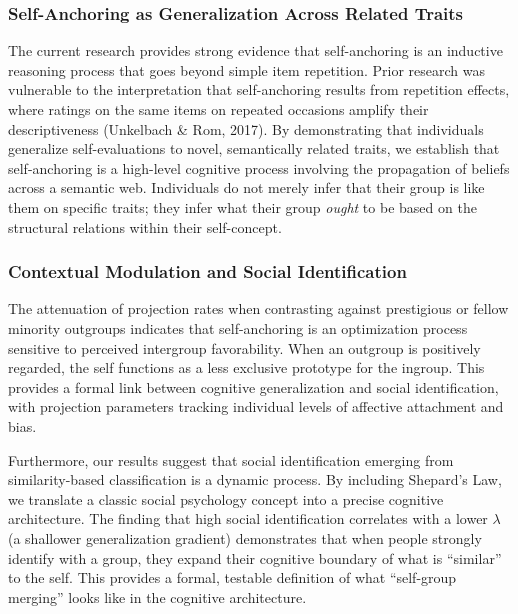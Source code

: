 \documentclass[
  man,
  longtable,
  nolmodern,
  notxfonts,
  notimes,
  man]{apa7}
\begin{document}
\subsubsection{Self-Anchoring as Generalization Across Related
Traits}\label{self-anchoring-as-generalization-across-related-traits}

The current research provides strong evidence that self-anchoring is an
inductive reasoning process that goes beyond simple item repetition.
Prior research was vulnerable to the interpretation that self-anchoring
results from repetition effects, where ratings on the same items on
repeated occasions amplify their descriptiveness (Unkelbach \& Rom,
2017). By demonstrating that individuals generalize self-evaluations to
novel, semantically related traits, we establish that self-anchoring is
a high-level cognitive process involving the propagation of beliefs
across a semantic web. Individuals do not merely infer that their group
is like them on specific traits; they infer what their group
\emph{ought} to be based on the structural relations within their
self-concept.

\subsubsection{Contextual Modulation and Social
Identification}\label{contextual-modulation-and-social-identification}

The attenuation of projection rates when contrasting against prestigious
or fellow minority outgroups indicates that self-anchoring is an
optimization process sensitive to perceived intergroup favorability.
When an outgroup is positively regarded, the self functions as a less
exclusive prototype for the ingroup. This provides a formal link between
cognitive generalization and social identification, with projection
parameters tracking individual levels of affective attachment and bias.

Furthermore, our results suggest that social identification emerging
from similarity-based classification is a dynamic process. By including
Shepard's Law, we translate a classic social psychology concept into a
precise cognitive architecture. The finding that high social
identification correlates with a lower \(\lambda\) (a shallower
generalization gradient) demonstrates that when people strongly identify
with a group, they expand their cognitive boundary of what is
``similar'' to the self. This provides a formal, testable definition of
what ``self-group merging'' looks like in the cognitive architecture.
\end{document}
